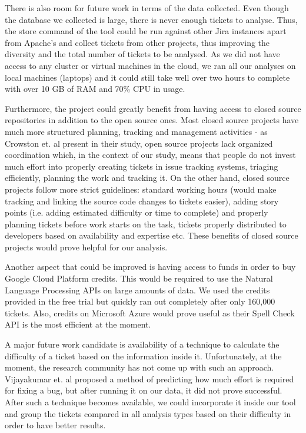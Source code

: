 \documentclass{mpaper}
\begin{document}
There is also room for future work in terms of the data collected. Even though the database we collected 
is large, there is never enough tickets to analyse. Thus, the store command of the tool could be run against 
other Jira instances apart from Apache's and collect tickets from other projects, thus improving the diversity 
and the total number of tickets to be analysed. As we did not have access to any cluster or virtual machines in 
the cloud, we ran all our analyses on local machines (laptops) and it could still take well over two hours to complete 
with over 10 GB of RAM and 70\% CPU in usage.

Furthermore, the project could greatly benefit from having access to closed source repositories in addition to the 
open source ones. Most closed source projects have much more structured planning, tracking and management activities - as 
Crowston et. al \cite{crowston2012free} present in their study, open source projects lack organized coordination which,
in the context of our study, means that people do not invest much effort into properly creating tickets in issue tracking 
systems, triaging efficiently, planning the work and tracking it. On the other hand, closed source projects follow 
more strict guidelines: standard working hours (would make tracking and linking the source code changes to tickets easier), 
adding story points (i.e. adding estimated difficulty or time to complete) and properly planning tickets before work 
starts on the task, tickets properly distributed to developers based on availability and expertise etc. These benefits 
of closed source projects would prove helpful for our analysis.

Another aspect that could be improved is having access to funds in order to buy Google Cloud Platform credits. This 
would be required to use the Natural Language Processing APIs on large amounts of data. We used the credits provided 
in the free trial but quickly ran out completely after only 160,000 tickets. Also, credits on Microsoft Azure would 
prove useful as their Spell Check API is the most efficient at the moment.

A major future work candidate is availability of a technique to calculate the difficulty of a ticket based on the information
inside it. Unfortunately, at the moment, the research community has not come up with such an approach. 
Vijayakumar et. al \cite{vijayakumar2014much} proposed a method of predicting how much effort is required for fixing 
a bug, but after running it on our data, it did not prove successful. After such a technique becomes available, we could 
incorporate it inside our tool and group the tickets compared in all analysis types based on their difficulty in order to 
have better results.
\end{document}
